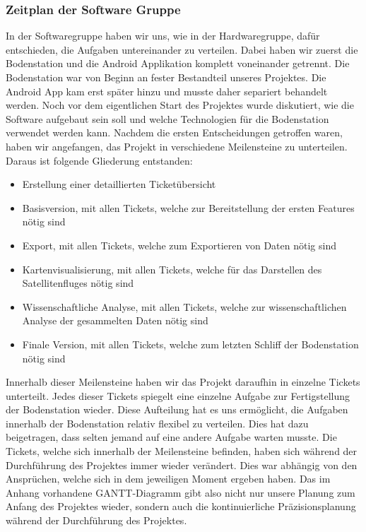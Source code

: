 \subsubsection{Zeitplan der Software Gruppe}
In der Softwaregruppe haben wir uns, wie in der Hardwaregruppe, dafür entschieden, die Aufgaben untereinander zu verteilen. Dabei haben wir zuerst die Bodenstation und die Android Applikation komplett voneinander getrennt. Die Bodenstation war von Beginn an fester Bestandteil unseres Projektes. Die Android App kam erst später hinzu und musste daher separiert behandelt werden. Noch vor dem eigentlichen Start des Projektes wurde diskutiert, wie die Software aufgebaut sein soll und welche Technologien für die Bodenstation verwendet werden kann. Nachdem die ersten Entscheidungen getroffen waren, haben wir angefangen, das Projekt in verschiedene Meilensteine zu unterteilen. Daraus ist folgende Gliederung entstanden:
\begin{itemize}
    \item Erstellung einer detaillierten Ticketübersicht
    \item Basisversion, mit allen Tickets, welche zur Bereitstellung der ersten Features nötig sind
    \item Export, mit allen Tickets, welche zum Exportieren von Daten nötig sind
    \item Kartenvisualisierung, mit allen Tickets, welche für das Darstellen des Satellitenfluges nötig sind
    \item Wissenschaftliche Analyse, mit allen Tickets, welche zur wissenschaftlichen Analyse der gesammelten Daten nötig sind
    \item Finale Version, mit allen Tickets, welche zum letzten Schliff der Bodenstation nötig sind
\end{itemize}
Innerhalb dieser Meilensteine haben wir das Projekt daraufhin in einzelne Tickets unterteilt. Jedes dieser Tickets spiegelt eine einzelne Aufgabe zur Fertigstellung der Bodenstation wieder. Diese Aufteilung hat es uns ermöglicht, die Aufgaben innerhalb der Bodenstation relativ flexibel zu verteilen. Dies hat dazu beigetragen, dass selten jemand auf eine andere Aufgabe warten musste. Die Tickets, welche sich innerhalb der Meilensteine befinden, haben sich während der Durchführung des Projektes immer wieder verändert. Dies war abhängig von den Ansprüchen, welche sich in dem jeweiligen Moment ergeben haben. Das im Anhang vorhandene GANTT-Diagramm gibt also nicht nur unsere Planung zum Anfang des Projektes wieder, sondern auch die kontinuierliche Präzisionsplanung während der Durchführung des Projektes.

